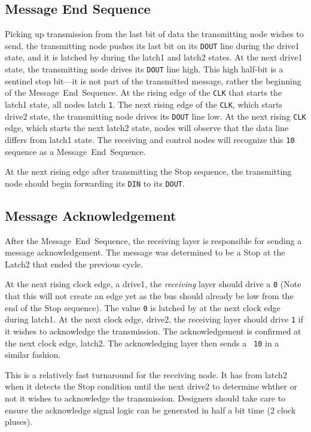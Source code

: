 \subsection{Message End Sequence}
\label{sec:protocol-end}
Picking up transmission from the last bit of data the transmitting node wishes
to send, the transmitting node pushes its last bit on its {\tt DOUT} line
during the {\sc drive1} state, and it is latched by \bus during the {\sc
latch1} and {\sc latch2} states.  At the next {\sc drive1} state, the 
transmitting node drives its {\tt DOUT} line high. This high half-bit is a sentinel 
stop bit---it is not part of the transmitted message, rather the beginning of 
the Message~End~Sequence. At the rising edge of the {\tt CLK} that starts the
{\sc latch1} state, all \bus nodes latch {\tt 1}. The next rising edge of the
{\tt CLK}, which starts {\sc drive2} state, the transmitting node drives its 
{\tt DOUT} line low. At the next rising {\tt CLK} edge, which starts the next 
{\sc latch2} state, nodes will observe that the data line differs from 
{\sc latch1} state. The receiving and control nodes will recognize this
{\tt 10} sequence as a Message~End~Sequence.

At the next rising edge after transmitting the Stop sequence, the transmitting
node should begin forwarding its {\tt DIN} to its {\tt DOUT}.

\subsection{Message Acknowledgement}
\label{sec:protocol-ack}
After the Message~End~Sequence, the receiving layer is responsible for sending a
message acknowledgement. The message was determined to be a Stop at the {\sc
Latch2} that ended the previous cycle.

At the next rising clock edge, a {\sc drive1}, the {\em receiving} layer
should drive a {\tt 0} (Note that this will not create an edge yet as the bus
should already be low from the end of the Stop sequence). The value {\tt 0}
is latched by \bus at the next clock edge during {\sc latch1}. At the next
clock edge, {\sc drive2}, the receiving layer should drive {\tt 1} if it
wishes to acknowledge the transmission. The acknowledgement is confirmed at
the next clock edge, {\sc latch2}. The acknowledging layer then sends a {\tt
10} in a similar fashion.

This is a relatively fast turnaround for the receiving node. It has from {\sc
latch2} when it detects the Stop condition until the next {\sc drive2} to
determine whther or not it wishes to acknowledge the transmission. Designers
should take care to ensure the acknowledge signal logic can be generated in
half a bit time (2 clock pluses).

